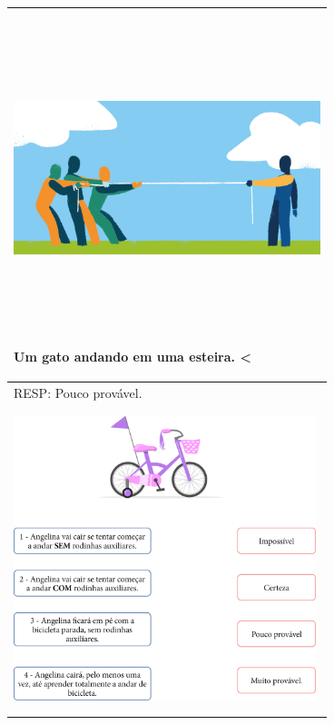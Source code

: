 \begin{longtable}[]{@{}l@{}}
\toprule
\begin{minipage}[b]{0.97\columnwidth}\raggedright\strut
\includegraphics[width=3.52083in,height=3.52083in]{media/image86.png}

Um gato andando em uma esteira. \textless{}
\end{minipage}\tabularnewline
\midrule
\endhead
RESP: Pouco provável.\tabularnewline
\begin{minipage}[t]{0.97\columnwidth}\raggedright\strut
\includegraphics[width=3.46875in,height=3.46875in]{media/image87.png}


\end{minipage}
\end{longtable}

